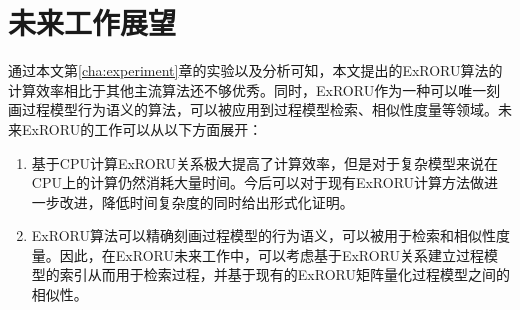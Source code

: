 \section{未来工作展望}\label{sec:future_work}
通过本文第\ref{cha:experiment}章的实验以及分析可知，本文提出的ExRORU算法的计算效率相比于其他主流算法还不够优秀。同时，ExRORU作为一种可以唯一刻画过程模型行为语义的算法，可以被应用到过程模型检索、相似性度量等领域。未来ExRORU的工作可以从以下方面展开：
\begin{enumerate}[1.]
  \item 基于CPU计算ExRORU关系极大提高了计算效率，但是对于复杂模型来说在CPU上的计算仍然消耗大量时间。今后可以对于现有ExRORU计算方法做进一步改进，降低时间复杂度的同时给出形式化证明。
  \item ExRORU算法可以精确刻画过程模型的行为语义，可以被用于检索和相似性度量。因此，在ExRORU未来工作中，可以考虑基于ExRORU关系建立过程模型的索引从而用于检索过程，并基于现有的ExRORU矩阵量化过程模型之间的相似性。
\end{enumerate}